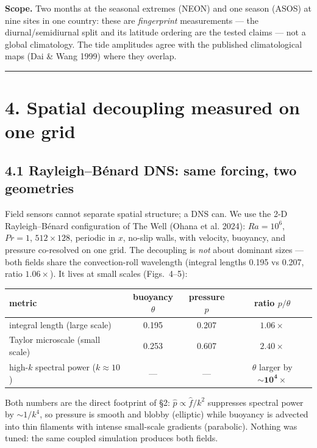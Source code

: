 \documentclass[aps,prfluids,preprint,superscriptaddress,nofootinbib]{revtex4-2}
\begin{document}
\textbf{Scope.} Two months at the seasonal extremes (NEON) and one season (ASOS) at nine sites in one country: these are \emph{fingerprint} measurements --- the diurnal/semidiurnal split and its latitude ordering are the tested claims --- not a global climatology. The tide amplitudes agree with the published climatological maps (Dai \& Wang 1999) where they overlap.

\medskip\hrule\medskip

\section*{4. Spatial decoupling measured on one grid}

\subsection*{4.1 Rayleigh--B\'enard DNS: same forcing, two geometries}

Field sensors cannot separate spatial structure; a DNS can. We use the 2-D Rayleigh--B\'enard configuration of The Well (Ohana et al. 2024): $Ra=10^{6}$, $Pr=1$, $512\times 128$, periodic in $x$, no-slip walls, with velocity, buoyancy, and pressure co-resolved on one grid. The decoupling is \emph{not} about dominant sizes --- both fields share the convection-roll wavelength (integral lengths 0.195 vs 0.207, ratio $1.06\times$). It lives at small scales (Figs.~4--5):

\begin{center}
\begin{tabular}{lccc}
\toprule
metric & buoyancy $\theta$ & pressure $p$ & ratio $p/\theta$ \\
\midrule
integral length (large scale) & 0.195 & 0.207 & $1.06\times$ \\
Taylor microscale (small scale) & 0.253 & 0.607 & $\mathbf{2.40\times}$ \\
high-$k$ spectral power ($k\approx 10$) & --- & --- & $\theta$ larger by $\sim\mathbf{10^{4}\times}$ \\
\bottomrule
\end{tabular}
\end{center}

Both numbers are the direct footprint of \S2: $\hat{p}\propto\hat{f}/k^{2}$ suppresses spectral power by $\sim 1/k^{4}$, so pressure is smooth and blobby (elliptic) while buoyancy is advected into thin filaments with intense small-scale gradients (parabolic). Nothing was tuned: the same coupled simulation produces both fields.
\end{document}
